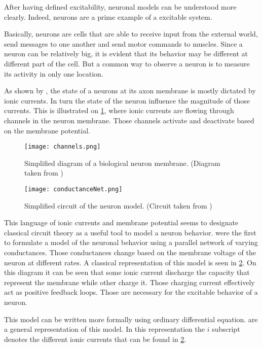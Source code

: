 After having defined excitability, neuronal models can be understood more clearly. Indeed, neurons are a prime example of a excitable system.

Basically, neurons are cells that are able to receive input from the external world, send messages to one another and send motor commands to muscles. Since a neuron can be relatively big, it is evident that its behavior may be different at different part of the cell. But a common way to observe a neuron is to measure its activity in only one location.

As shown by \citet{neuronIons}, the state of a neurons at its axon membrane is mostly dictated by ionic currents. In turn the state of the neuron influence the magnitude of those currents. This is illustrated on \cref{fig:conductance_neuron}, where ionic currents are flowing through channels in the neuron membrane. Those channels activate and deactivate based on the membrane potential.

\begin{figure}[htb]
    \centering
    \texttt{[image: channels.png]}
    \caption{Simplified diagram of a biological neuron membrane. (Diagram taken from \citet{channelDiagram})}
    \label{fig:conductance_neuron}
\end{figure}

\begin{figure}[htb]
    \centering
    \texttt{[image: conductanceNet.png]}
    \caption{Simplified circuit of the neuron model. (Circuit taken from \citet{electricDiagram})}
    \label{fig:conductance_neuron_circuit}
\end{figure}

This language of ionic currents and membrane potential seems to designate classical circuit theory as a useful tool to model a neuron behavior.
\citet{conductanceModel} were the first to formulate a model of the neuronal behavior using a parallel network of varying conductances. Those conductances change based on the membrane voltage of the neuron at different rates. A classical representation of this model is seen in \cref{fig:conductance_neuron_circuit}. On this diagram it can be seen that some ionic current discharge the capacity that represent the membrane while other charge it. Those charging current effectively act as positive feedback loops. Those are necessary for the excitable behavior of a neuron.

This model can be written more formally using ordinary differential equation.  are a general representation of this model. In this representation the $i$ subscript denotes the different ionic currents that can be found in \cref{fig:conductance_neuron_circuit}.

